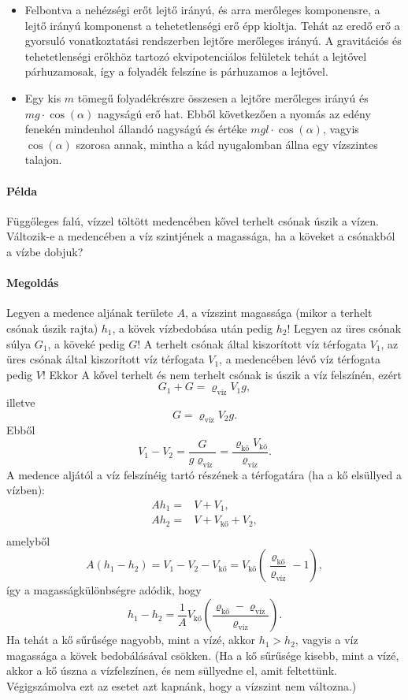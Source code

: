 \documentclass[12pt,a4paper]{scrartcl}
\begin{document}
\begin{itemize}
\item Felbontva a nehézségi erőt lejtő irányú, és arra merőleges komponensre, a lejtő irányú komponenst a tehetetlenségi erő épp kioltja. Tehát az eredő erő a gyorsuló vonatkoztatási rendszerben lejtőre merőleges irányú. A gravitációs és tehetetlenségi erőkhöz tartozó ekvipotenciálos felületek tehát a lejtővel párhuzamosak, így a folyadék felszíne is párhuzamos a lejtővel. 
\item Egy kis $m$ tömegű folyadékrészre összesen a lejtőre merőleges irányú és $mg \cdot \cos \left( \alpha  \right)$ nagyságú erő hat. Ebből következően a nyomás az edény fenekén mindenhol állandó nagyságú és értéke $mgl \cdot \cos \left( \alpha  \right)$, vagyis $\cos \left( \alpha  \right)$ szorosa annak, mintha a kád nyugalomban állna egy vízszintes talajon.
\end{itemize}

\paragraph{Példa}
Függőleges falú, vízzel töltött medencében kővel terhelt csónak úszik a vízen. Változik-e a medencében a víz szintjének a magassága, ha a köveket a csónakból a vízbe dobjuk?

\paragraph{Megoldás}
Legyen a medence aljának területe $A$, a vízszint magassága (mikor a terhelt csónak úszik rajta) $h_1$, a kövek vízbedobása után pedig $h_2$! Legyen az üres csónak súlya $G_1$, a köveké pedig $G$! A terhelt csónak által kiszorított víz térfogata $V_1$, az üres csónak által kiszorított víz térfogata $V_1$, a medencében lévő víz térfogata pedig $V$! Ekkor
A kővel terhelt és nem terhelt csónak is úszik a víz felszínén, ezért
\[{G_1} + G = {\varrho _{\text{víz}}}{V_1}g,\]
illetve
\[G = {\varrho _{\text{víz}}}{V_2}g.\]
Ebből
\[{V_1} - {V_2} = \frac{G}{{g{\varrho _{\text{víz}}}}} = \frac{{{\varrho _{\text{kő}}}{V_{\text{kő}}}}}{{{\varrho _{\text{víz}}}}}.\]
A medence aljától a víz felszínéig tartó részének a térfogatára (ha a kő elsüllyed a vízben):
\[\begin{aligned}
  A{h_1} =  & V + {V_1}, \\ 
  A{h_2} =  & V + {V_{{\text{kő}}}} + {V_2}, \\ 
\end{aligned} \]
amelyből
\[A\left( {{h_1} - {h_2}} \right) = {V_1} - {V_2} - {V_{{\text{kő}}}} = {V_{{\text{kő}}}}\left( {\frac{{{\varrho _{{\text{kő}}}}}}{{{\varrho _{{\text{víz}}}}}} - 1} \right),\]
így a magasságkülönbségre adódik, hogy
\[{h_1} - {h_2} = \frac{1}{A}{V_{{\text{kő}}}}\left( {\frac{{{\varrho _{{\text{kő}}}} - {\varrho _{{\text{víz}}}}}}{{{\varrho _{{\text{víz}}}}}}} \right).\]
Ha tehát a kő sűrűsége nagyobb, mint a vízé, akkor $h_1 > h_2$, vagyis a víz magassága a kövek bedobálásával csökken. (Ha a kő sűrűsége kisebb, mint a vízé, akkor a kő úszna a vízfelszínen, és nem süllyedne el, amit feltettünk. Végigszámolva ezt az esetet azt kapnánk, hogy a vízszint nem változna.)
\normalsize
\end{document}
